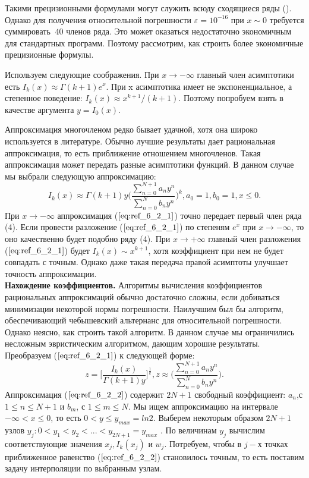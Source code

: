 Такими прецизионными формулами могут служить всюду сходящиеся ряды (). Однако для получения относительной погрешности $\varepsilon=10^{-16}$ при $x \sim 0$ требуется суммировать $~40$ членов ряда. Это может оказаться недостаточно экономичным для стандартных программ. Поэтому рассмотрим, как строить более экономичные прецизионные формулы.

Используем следующие соображения. При $x \to -\infty$ главный член асимптотики есть $I_k(x) \approx \Gamma(k+1) e^x$.
При x асимптотика имеет не экспоненциальное, а степенное поведение: $I_k(x) \approx x^{k+1}/(k+1)$. Поэтому попробуем взять в качестве аргумента $y = I_0(x)$.

Аппроксимация многочленом редко бывает удачной, хотя она широко
используется в литературе. Обычно лучшие результаты дает рациональная
аппроксимация, то есть приближение отношением многочленов. Такая аппроксимация может передать разные асимптотики функций. В данном случае мы выбрали следующую аппроксимацию:
\begin{equation}
I_k(x) \approx \Gamma(k+1)y \Bigg( \frac{\sum\limits_{n=0}^{N+1} a_ny^{n}}{\sum\limits_{n=0}^{N} b_ny^{n}} \Bigg)^k,a_0=1,b_0=1,x \leqslant 0.
\label{eq:ref_6_2_1}
\end{equation}
При $x \to -\infty$ аппроксимация ($\ref{eq:ref_6_2_1}$) точно передает первый член ряда (4). Если
провести разложение ($\ref{eq:ref_6_2_1}$) по степеням $e^x$ при $x \to -\infty$, то оно качественно
будет подобно ряду (4). При $x \to +\infty$ главный член разложения ($\ref{eq:ref_6_2_1}$) будет
$I_k(x) \sim x^{k+1}$, хотя коэффициент при нем не будет совпадать с точным. Однако
даже такая передача правой асимптоты улучшает точность аппроксимации.
\\

\textbf{Нахождение коэффициентов.} Алгоритмы вычисления коэффициентов рациональных аппроксимаций
обычно достаточно сложны, если добиваться минимизации некоторой нормы
погрешности. Наилучшим был бы алгоритм, обеспечивающий чебышевский альтернанс для относительной погрешности. Однако неясно, как строить такой алгоритм. В данном случае мы ограничились несложным эвристическим алгоритмом, дающим хорошие результаты. Преобразуем ($\ref{eq:ref_6_2_1}$) к следующей
форме:
\begin{equation}
z = \bigg[ \frac{I_k(x)}{\Gamma(k+1)y} \bigg]^{\frac{1}{k}}, z \approx \Bigg( \frac{\sum\limits_{n=0}^{N+1} a_n y^n}{\sum\limits_{n=0}^{N} b_n y^n} \Bigg).
\label{eq:ref_6_2_2}
\end{equation}
Аппроксимация ($\ref{eq:ref_6_2_2}$) содержит $2N + 1$ свободный коэффициент: $a_n$,с $1 \leqslant n \leqslant N + 1$ и $b_m$, с $1 \leqslant m \leqslant N$.
Мы ищем аппроксимацию на интервале $-\infty < x \leqslant 0$, то есть $0 < y \leqslant y_{max} = ln2$. 
Выберем некоторым образом $2N +1$ узлов $y_j : 0 < y_1 < y_2 < ... < y_{2N+1} = y_{max}$ .
По величинам $y_j$ вычислим соответствующие значения $x_j, I_k(x_j)$ и $w_j$. Потребуем, чтобы в $j-$х точках приближенное равенство ($\ref{eq:ref_6_2_2}$) становилось точным, то есть поставим задачу интерполяции
по выбранным узлам.


